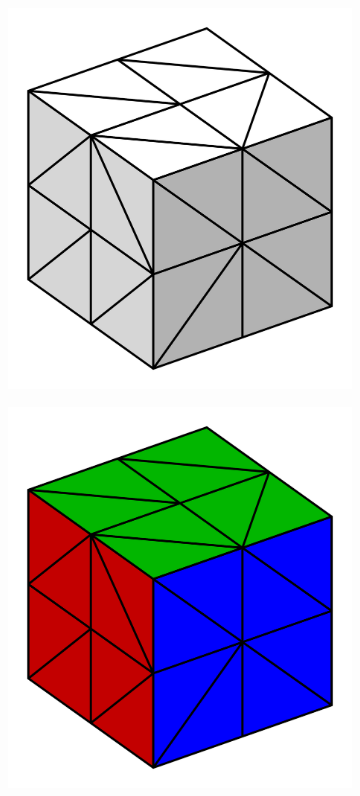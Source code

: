 \documentclass[../ClassicThesis.tex]{subfiles}
\begin{document}
\begin{figure}
    \centering
    \begin{subfigure}[t]{0.4\textwidth}
      \centering
      \includegraphics[width=\textwidth]{Images/testBox_plain.png}
    \end{subfigure}
    \begin{subfigure}[t]{0.4\textwidth}
      \centering
      \includegraphics[width=\textwidth]{Images/testBox_colored.png}

\end{subfigure}
\end{figure}
\end{document}
